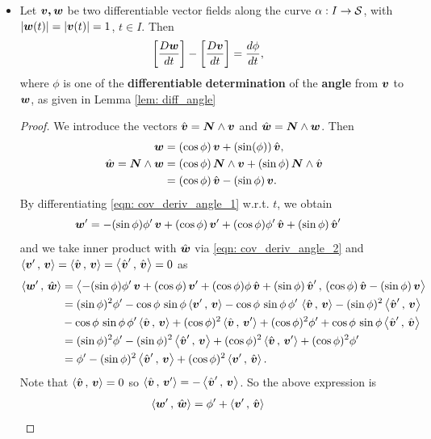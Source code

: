 \documentclass[11pt]{article}
\begin{document}
\begin{itemize}
\item \begin{lemma} \label{lem: cov_deriv_angle}
Let $\boldsymbol{v,w}$ be two differentiable vector fields along the curve $\alpha: I \rightarrow {\mathcal S}$, with $\left\lvert \boldsymbol{w}(t) \right\rvert = \left\lvert \boldsymbol{v}(t) \right\rvert = 1$, $t\in I$. Then 
\begin{align*}
\left[\frac{D\boldsymbol{w}}{dt}\right] - \left[\frac{D\boldsymbol{v}}{dt}\right] &= \frac{d\phi}{dt},
\end{align*}
where $\phi$ is one of the \textbf{differentiable} \textbf{determination} of the \textbf{angle} from $\boldsymbol{v}$ to $\boldsymbol{w}$, as given in Lemma \ref{lem: diff_angle}
\end{lemma}
\begin{proof}
We introduce the vectors $\hat{\boldsymbol{v}} = \boldsymbol{N}\wedge \boldsymbol{v}$ and $\hat{\boldsymbol{w}} = \boldsymbol{N}\wedge \boldsymbol{w}$. Then 
\begin{align}
\boldsymbol{w} &= (\cos\phi)\,\boldsymbol{v} + (\sin(\phi))\,\hat{\boldsymbol{v}}, \label{eqn: cov_deriv_angle_1}\\
\hat{\boldsymbol{w}} =  \boldsymbol{N}\wedge \boldsymbol{w} &= (\cos\phi)\,\boldsymbol{N}\wedge\boldsymbol{v} + (\sin\phi)\,\boldsymbol{N}\wedge \hat{\boldsymbol{v}} \nonumber\\
&= (\cos\phi)\,\hat{\boldsymbol{v}} - (\sin\phi)\,\boldsymbol{v}. \label{eqn: cov_deriv_angle_2}
\end{align}
By differentiating \eqref{eqn: cov_deriv_angle_1} w.r.t. $t$, we obtain
\begin{align*}
\boldsymbol{w}' &= -(\sin\phi)\phi'\,\boldsymbol{v} + (\cos\phi)\,\boldsymbol{v}' + (\cos\phi)\phi'\,\hat{\boldsymbol{v}} + (\sin\phi)\,\hat{\boldsymbol{v}}'
\end{align*}
and we take inner product with $\hat{\boldsymbol{w}}$ via  \eqref{eqn: cov_deriv_angle_2} and $\left\langle \boldsymbol{v}'\,,\, \boldsymbol{v} \right\rangle = \left\langle \hat{\boldsymbol{v}}\,,\, \boldsymbol{v} \right\rangle =\left\langle \hat{\boldsymbol{v}}'\,,\, \hat{\boldsymbol{v}}  \right\rangle =  0$ as
\begin{align*}
\left\langle \boldsymbol{w}' \,,\, \hat{\boldsymbol{w}} \right\rangle&= \left\langle -(\sin\phi)\phi'\,\boldsymbol{v} + (\cos\phi)\,\boldsymbol{v}' + (\cos\phi)\phi\,\hat{\boldsymbol{v}} + (\sin\phi)\,\hat{\boldsymbol{v}}'\,,\,  (\cos\phi)\,\hat{\boldsymbol{v}} - (\sin\phi)\,\boldsymbol{v} \right\rangle\\
&= (\sin\phi)^{2}\phi' - \cos\phi\,\sin\phi \left\langle \boldsymbol{v}'\,,\, \boldsymbol{v} \right\rangle -\cos\phi\,\sin\phi\,\phi'\,\left\langle \hat{\boldsymbol{v}}\,,\, \boldsymbol{v} \right\rangle
- (\sin\phi)^{2}\left\langle \hat{\boldsymbol{v}}'\,,\, \boldsymbol{v} \right\rangle \\
&-\cos\phi\,\sin\phi\,\phi'\left\langle \hat{\boldsymbol{v}}\,,\, \boldsymbol{v} \right\rangle +  (\cos\phi)^{2}\left\langle \hat{\boldsymbol{v}}\,,\, \boldsymbol{v}' \right\rangle + (\cos\phi)^{2}\phi'
+ \cos\phi\,\sin\phi \left\langle \hat{\boldsymbol{v}}'\,,\, \hat{\boldsymbol{v}}  \right\rangle\\
&=  (\sin\phi)^{2}\phi' - (\sin\phi)^{2}\left\langle \hat{\boldsymbol{v}}'\,,\, \boldsymbol{v} \right\rangle +  (\cos\phi)^{2}\left\langle \hat{\boldsymbol{v}}\,,\, \boldsymbol{v}' \right\rangle + (\cos\phi)^{2}\phi'\\
& = \phi'- (\sin\phi)^{2}\left\langle \hat{\boldsymbol{v}}'\,,\, \boldsymbol{v} \right\rangle +  (\cos\phi)^{2}\left\langle \boldsymbol{v}'\,,\, \hat{\boldsymbol{v}} \right\rangle.
\end{align*}
Note that $\left\langle \hat{\boldsymbol{v}}\,,\, \boldsymbol{v} \right\rangle  = 0$ so $\left\langle \hat{\boldsymbol{v}}\,,\, \boldsymbol{v}' \right\rangle  = - \left\langle \hat{\boldsymbol{v}}'\,,\, \boldsymbol{v} \right\rangle  $. So the above expression is
\begin{align*}
\left\langle \boldsymbol{w}' \,,\, \hat{\boldsymbol{w}} \right\rangle&= \phi' + \left\langle \boldsymbol{v}'\,,\, \hat{\boldsymbol{v}} \right\rangle
\end{align*}


\end{proof}
\end{itemize}
\end{document}
